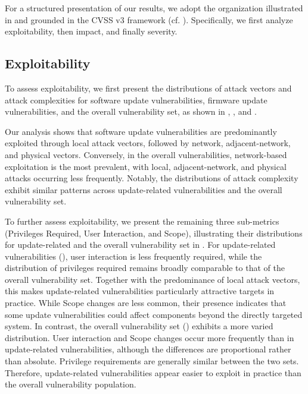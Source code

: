 \documentclass[fleqn,s1,names,tex]{neptune}
\begin{document}
For a structured presentation of our results, we adopt the organization illustrated in   and grounded in the CVSS v3 framework (cf.  ). 
Specifically, we first analyze exploitability, then impact, and finally severity.


\subsection{Exploitability}



To assess exploitability, we first present the distributions of attack vectors and attack complexities for software update vulnerabilities, firmware update vulnerabilities, and the overall vulnerability set, as shown in  ,  , and .


Our analysis shows that software update vulnerabilities are predominantly exploited through local attack vectors, followed by network, adjacent-network, and physical vectors.
Conversely, in the overall vulnerabilities, network-based exploitation is the most prevalent, with local, adjacent-network, and physical attacks occurring less frequently.
Notably, the distributions of attack complexity exhibit similar patterns across update-related vulnerabilities and the overall vulnerability set.



To further assess exploitability, we present the remaining three sub-metrics (Privileges Required, User Interaction, and  Scope), illustrating their distributions for update-related and the overall vulnerability set in  .
For update-related vulnerabilities (), user interaction is less frequently required, while the distribution of privileges required remains broadly comparable to that of the overall vulnerability set. Together with the predominance of local attack vectors, this makes update-related vulnerabilities particularly attractive targets in practice. 
While Scope changes are less common, their presence indicates that some update vulnerabilities could affect components beyond the directly targeted system.
In contrast, the overall vulnerability set () exhibits a more varied distribution. User interaction and Scope changes occur more frequently than in update-related vulnerabilities, although the differences are proportional rather than absolute. Privilege requirements are generally similar between the two sets.
Therefore, update-related vulnerabilities appear easier to exploit in practice than the overall vulnerability population.
\end{document}
